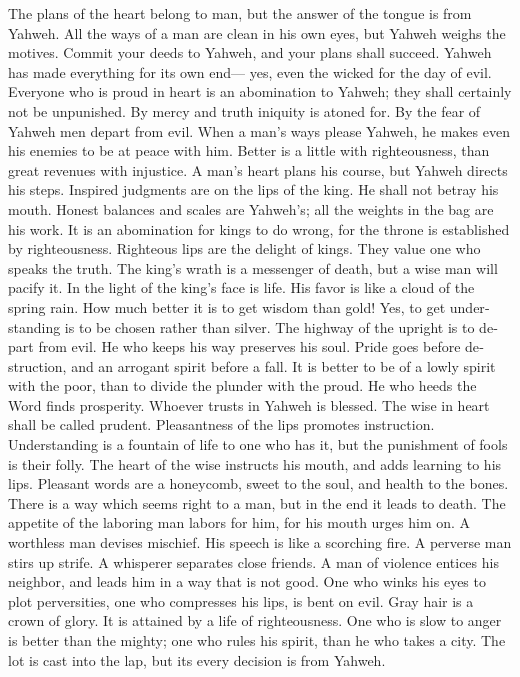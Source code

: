 \begin{paracol}{2}
\begin{otherlanguage}{english}
 The plans of the heart belong to man, but the answer of
the tongue is from Yahweh.  All the ways of a man are
clean in his own eyes, but Yahweh weighs the motives. 
Commit your deeds to Yahweh, and your plans shall succeed.
 Yahweh has made everything for its own end--- yes, even
the wicked for the day of evil.  Everyone who is proud in
heart is an abomination to Yahweh; they shall certainly not be
unpunished.  By mercy and truth iniquity is atoned for. By
the fear of Yahweh men depart from evil.  When a man's
ways please Yahweh, he makes even his enemies to be at peace with him.
 Better is a little with righteousness, than great
revenues with injustice.  A man's heart plans his course,
but Yahweh directs his steps.  Inspired judgments are on
the lips of the king. He shall not betray his mouth. 
Honest balances and scales are Yahweh's; all the weights in the bag are
his work.  It is an abomination for kings to do wrong,
for the throne is established by righteousness. 
Righteous lips are the delight of kings. They value one who speaks the
truth.  The king's wrath is a messenger of death, but a
wise man will pacify it.  In the light of the king's face
is life. His favor is like a cloud of the spring rain. 
How much better it is to get wisdom than gold! Yes, to get understanding
is to be chosen rather than silver.  The highway of the
upright is to depart from evil. He who keeps his way preserves his soul.
 Pride goes before destruction, and an arrogant spirit
before a fall.  It is better to be of a lowly spirit with
the poor, than to divide the plunder with the proud.  He
who heeds the Word finds prosperity. Whoever trusts in Yahweh is
blessed.  The wise in heart shall be called prudent.
Pleasantness of the lips promotes instruction. 
Understanding is a fountain of life to one who has it, but the
punishment of fools is their folly.  The heart of the
wise instructs his mouth, and adds learning to his lips. 
Pleasant words are a honeycomb, sweet to the soul, and health to the
bones.  There is a way which seems right to a man, but in
the end it leads to death.  The appetite of the laboring
man labors for him, for his mouth urges him on.  A
worthless man devises mischief. His speech is like a scorching fire.
 A perverse man stirs up strife. A whisperer separates
close friends.  A man of violence entices his neighbor,
and leads him in a way that is not good.  One who winks
his eyes to plot perversities, one who compresses his lips, is bent on
evil.  Gray hair is a crown of glory. It is attained by a
life of righteousness.  One who is slow to anger is
better than the mighty; one who rules his spirit, than he who takes a
city.  The lot is cast into the lap, but its every
decision is from Yahweh.


\end{otherlanguage}
\end{paracol}

